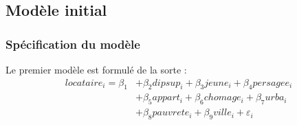 \documentclass{article}
\begin{document}
\subsection{Modèle initial}
\subsubsection{Spécification du modèle}
Le premier modèle est formulé de la sorte : 
\begin{equation}
\begin{split}
		locataire_i =  \beta_1 &+ \beta_2dipsup_i + \beta_3jeune_i + \beta_4persagee_i \\
						&+ \beta_5appart_i + \beta_6chomage_i + \beta_7urba_i \\
						&+ \beta_8pauvrete_i + \beta_9ville_i + \varepsilon_i 
\end{split}
\end{equation}
\end{document}
